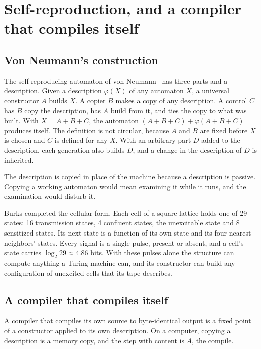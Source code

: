 \chapter{\texorpdfstring{Self-reproduction, and a compiler that compiles itself}{Self-reproduction, and a compiler that compiles itself}}
\label{chap:self-reproduction}

\section{\texorpdfstring{Von Neumann's construction}{Von Neumann's construction}}

The self-reproducing automaton of von Neumann~\cite{src:von-Neumann-1966} has three parts and a description. Given a description \(\varphi(X)\) of any automaton \(X\), a universal constructor \(A\) builds \(X\). A copier \(B\) makes a copy of any description. A control \(C\) has \(B\) copy the description, has \(A\) build from it, and ties the copy to what was built. With \(X = A + B + C\), the automaton \((A + B + C) + \varphi(A + B + C)\) produces itself. The definition is not circular, because \(A\) and \(B\) are fixed before \(X\) is chosen and \(C\) is defined for any \(X\). With an arbitrary part \(D\) added to the description, each generation also builds \(D\), and a change in the description of \(D\) is inherited.

The description is copied in place of the machine because a description is passive. Copying a working automaton would mean examining it while it runs, and the examination would disturb it.

Burks completed the cellular form. Each cell of a square lattice holds one of 29 states: 16 transmission states, 4 confluent states, the unexcitable state and 8 sensitized states. Its next state is a function of its own state and its four nearest neighbors' states. Every signal is a single pulse, present or absent, and a cell's state carries \(\log_2 29 \approx 4.86\) bits. With these pulses alone the structure can compute anything a Turing machine can, and its constructor can build any configuration of unexcited cells that its tape describes.

\section{\texorpdfstring{A compiler that compiles itself}{A compiler that compiles itself}}

A compiler that compiles its own source to byte-identical output is a fixed point of a constructor applied to its own description. On a computer, copying a description is a memory copy, and the step with content is \(A\), the compile.


